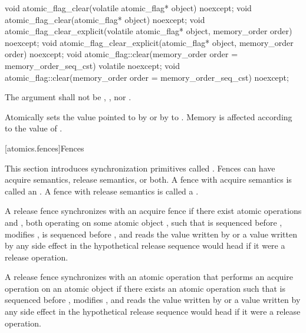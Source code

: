%
%
%
\begin{itemdecl}
void atomic_flag_clear(volatile atomic_flag* object) noexcept;
void atomic_flag_clear(atomic_flag* object) noexcept;
void atomic_flag_clear_explicit(volatile atomic_flag* object, memory_order order) noexcept;
void atomic_flag_clear_explicit(atomic_flag* object, memory_order order) noexcept;
void atomic_flag::clear(memory_order order = memory_order_seq_cst) volatile noexcept;
void atomic_flag::clear(memory_order order = memory_order_seq_cst) noexcept;
\end{itemdecl}

\begin{itemdescr}
\pnum
\requires The  argument shall not be ,
, nor .

\pnum
\effects Atomically sets the value pointed to by  or by  to
. Memory is affected according to the value of .
\end{itemdescr}

[atomics.fences]{Fences}

\pnum
This section introduces synchronization primitives called . Fences can have
acquire semantics, release semantics, or both. A fence with acquire semantics is called
an . A fence with release semantics is called a .

\pnum
A release fence  synchronizes with an acquire fence  if there exist
atomic operations  and , both operating on some atomic object
, such that  is sequenced before ,  modifies
,  is sequenced before , and  reads the value
written by  or a value written by any side effect in the hypothetical release
sequence  would head if it were a release operation.

\pnum
A release fence  synchronizes with an atomic operation  that
performs an acquire operation on an atomic object  if there exists an atomic
operation  such that  is sequenced before , 
modifies , and  reads the value written by  or a value
written by any side effect in the hypothetical release sequence  would head if
it were a release operation.

